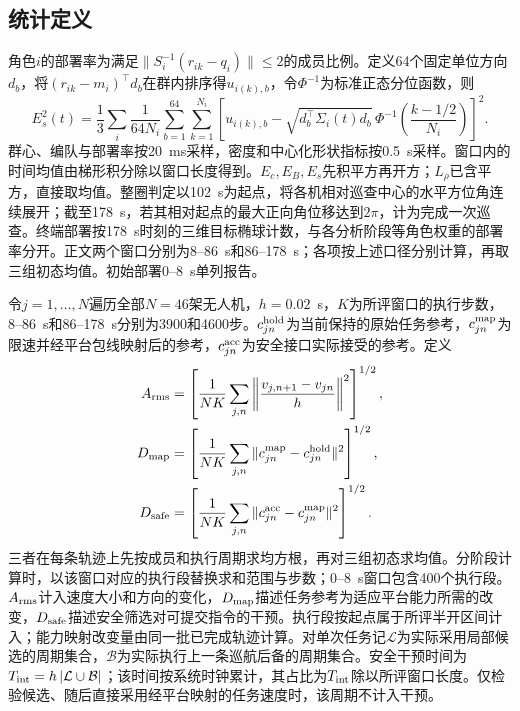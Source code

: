 \documentclass[UTF8,a4paper,11pt,fontset=none]{ctexart}
\begin{document}
\subsection{统计定义}\label{app:metrics}
角色$i$的部署率为满足$\|S_i^{-1}(r_{ik}-q_i)\|\le2$的成员比例。定义64个固定单位方向$d_b$，将$(r_{ik}-m_i)^\top d_b$在群内排序得$u_{i(k),b}$，令$\Phi^{-1}$为标准正态分位函数，则
\[
 E_s^2(t)=\frac13\sum_i\frac{1}{64N_i}\sum_{b=1}^{64}\sum_{k=1}^{N_i}
 \left[u_{i(k),b}-\sqrt{d_b^\top\Sigma_i(t)d_b}\,
     \Phi^{-1}\!\left(\frac{k-1/2}{N_i}\right)\right]^2 .
\]
群心、编队与部署率按20~ms采样，密度和中心化形状指标按0.5~s采样。窗口内的时间均值由梯形积分除以窗口长度得到。$E_c,E_B,E_s$先积平方再开方；$L_\rho$已含平方，直接取均值。整圈判定以102~s为起点，将各机相对巡查中心的水平方位角连续展开；截至178~s，若其相对起点的最大正向角位移达到$2\pi$，计为完成一次巡查。终端部署按178~s时刻的三维目标椭球计数，与各分析阶段等角色权重的部署率分开。正文两个窗口分别为8--86~s和86--178~s；各项按上述口径分别计算，再取三组初态均值。初始部署0--8~s单列报告。

令$j=1,\ldots,N$遍历全部$N=46$架无人机，$h=0.02$~s，$K$为所评窗口的执行步数，8--86~s和86--178~s分别为3900和4600步。$c^{\rm hold}_{jn}$为当前保持的原始任务参考，$c^{\rm map}_{jn}$为限速并经平台包线映射后的参考，$c^{\rm acc}_{jn}$为安全接口实际接受的参考。定义
\begin{equation}
\begin{aligned}
A_{\rm rms}&=\left[\frac1{NK}\sum_{j,n}\left\|\frac{v_{j,n+1}-v_{jn}}h\right\|^2\right]^{1/2},\\
D_{\rm map}&=\left[\frac1{NK}\sum_{j,n}\|c^{\rm map}_{jn}-c^{\rm hold}_{jn}\|^2\right]^{1/2},\\
D_{\rm safe}&=\left[\frac1{NK}\sum_{j,n}\|c^{\rm acc}_{jn}-c^{\rm map}_{jn}\|^2\right]^{1/2}.
\end{aligned}\label{eq:effort-cost}
\end{equation}
三者在每条轨迹上先按成员和执行周期求均方根，再对三组初态求均值。分阶段计算时，以该窗口对应的执行段替换求和范围与步数；0--8~s窗口包含400个执行段。$A_{\rm rms}$计入速度大小和方向的变化，$D_{\rm map}$描述任务参考为适应平台能力所需的改变，$D_{\rm safe}$描述安全筛选对可提交指令的干预。执行段按起点属于所评半开区间计入；能力映射改变量由同一批已完成轨迹计算。对单次任务记$\mathcal L$为实际采用局部候选的周期集合，$\mathcal B$为实际执行上一条巡航后备的周期集合。安全干预时间为$T_{\rm int}=h\,|\mathcal L\cup\mathcal B|$；该时间按系统时钟累计，其占比为$T_{\rm int}$除以所评窗口长度。仅检验候选、随后直接采用经平台映射的任务速度时，该周期不计入干预。
\end{document}
